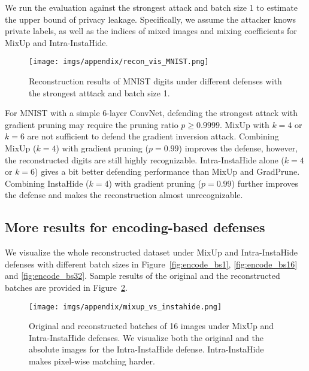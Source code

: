 We run the evaluation against the strongest attack and batch size 1 to estimate the upper bound of privacy leakage. Specifically, we assume the attacker knows private labels, as well as the indices of mixed images and mixing coefficients for MixUp and Intra-InstaHide. 

\begin{figure}[t]
    \centering
    \texttt{[image: imgs/appendix/recon\_vis\_MNIST.png]}
    \caption{Reconstruction results of MNIST digits under different defenses with the strongest atttack and batch size 1.}
    \label{fig:vis_recon_MNIST}
    \vspace{-5mm}
\end{figure}

For MNIST with a simple 6-layer ConvNet, defending the strongest attack with gradient pruning may require the pruning ratio $p\geq 0.9999$. MixUp with $k=4$ or $k=6$ are not sufficient to defend the gradient inversion attack. Combining MixUp ($k=4$) with gradient pruning ($p=0.99$) improves the defense, however, the reconstructed digits are still highly recognizable. Intra-InstaHide alone ($k=4$ or $k=6$) gives a bit better defending performance than MixUp and GradPrune. Combining InstaHide ($k=4$) with gradient pruning ($p=0.99$) further improves the defense and makes the reconstruction almost unrecognizable. 




\subsection{More results for encoding-based defenses}
We visualize the whole reconstructed dataset under MixUp and Intra-InstaHide defenses with different batch sizes in Figure~\ref{fig:encode_bs1}, \ref{fig:encode_bs16} and \ref{fig:encode_bs32}.  Sample results of the original and the reconstructed batches are provided in Figure~\ref{fig:mixup_vs_instahide}.

\begin{figure}[H]
    \centering
    \texttt{[image: imgs/appendix/mixup\_vs\_instahide.png]}
    \caption{Original and reconstructed batches of 16 images under MixUp and Intra-InstaHide defenses. We visualize both the original and the absolute images for the Intra-InstaHide defense. Intra-InstaHide makes pixel-wise matching harder.}
    \label{fig:mixup_vs_instahide}
    \vspace{-5mm}
\end{figure}

